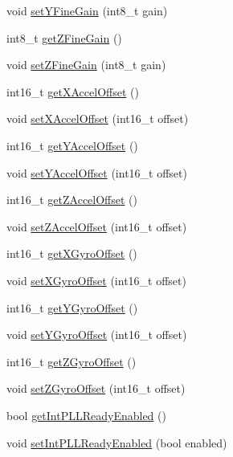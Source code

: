 \begin{DoxyCompactItemize}
\item 
void \mbox{\hyperlink{classMPU6050_a7f97e86dcfa1d491d8f809112c6fb40b}{set\+Y\+Fine\+Gain}} (int8\+\_\+t gain)
\item 
int8\+\_\+t \mbox{\hyperlink{classMPU6050_a13c980e62e6e7774299fea1c827b6e7a}{get\+Z\+Fine\+Gain}} ()
\item 
void \mbox{\hyperlink{classMPU6050_a98107dec68994cfc8c8cb1d0d78d2b6b}{set\+Z\+Fine\+Gain}} (int8\+\_\+t gain)
\item 
int16\+\_\+t \mbox{\hyperlink{classMPU6050_afdfe715ced419d117c2c47007d631f9e}{get\+X\+Accel\+Offset}} ()
\item 
void \mbox{\hyperlink{classMPU6050_a447144e025f55b1dc96d7c209c5defd6}{set\+X\+Accel\+Offset}} (int16\+\_\+t offset)
\item 
int16\+\_\+t \mbox{\hyperlink{classMPU6050_a7753d3c3f5d9e341f1ed0712079a0d12}{get\+Y\+Accel\+Offset}} ()
\item 
void \mbox{\hyperlink{classMPU6050_a6214fa36c8881f3b02a3e7033678bfb3}{set\+Y\+Accel\+Offset}} (int16\+\_\+t offset)
\item 
int16\+\_\+t \mbox{\hyperlink{classMPU6050_ac9a45355c735a09501b6a58c92fb752c}{get\+Z\+Accel\+Offset}} ()
\item 
void \mbox{\hyperlink{classMPU6050_a4d1868b660d695eae912ef73407e21e8}{set\+Z\+Accel\+Offset}} (int16\+\_\+t offset)
\item 
int16\+\_\+t \mbox{\hyperlink{classMPU6050_a4c1b9f42f59b11936da86b2a1b099981}{get\+X\+Gyro\+Offset}} ()
\item 
void \mbox{\hyperlink{classMPU6050_a7097c12d38a23fb0a286460619998470}{set\+X\+Gyro\+Offset}} (int16\+\_\+t offset)
\item 
int16\+\_\+t \mbox{\hyperlink{classMPU6050_a1874f796bd3ad97c5a72ab559b33e4a7}{get\+Y\+Gyro\+Offset}} ()
\item 
void \mbox{\hyperlink{classMPU6050_a9a725bf3be4e1a74e5f655194bf22bde}{set\+Y\+Gyro\+Offset}} (int16\+\_\+t offset)
\item 
int16\+\_\+t \mbox{\hyperlink{classMPU6050_aec9b1f7b83d8850858f4200b3afa79fd}{get\+Z\+Gyro\+Offset}} ()
\item 
void \mbox{\hyperlink{classMPU6050_aacf6f5599adbfb8ec685f2b96db6905e}{set\+Z\+Gyro\+Offset}} (int16\+\_\+t offset)
\item 
bool \mbox{\hyperlink{classMPU6050_a4d02c38682aa566b6204df3f81fbcb68}{get\+Int\+P\+L\+L\+Ready\+Enabled}} ()
\item 
void \mbox{\hyperlink{classMPU6050_aef44106927c1b986588f36bffaebea54}{set\+Int\+P\+L\+L\+Ready\+Enabled}} (bool enabled)

\end{DoxyCompactItemize}
